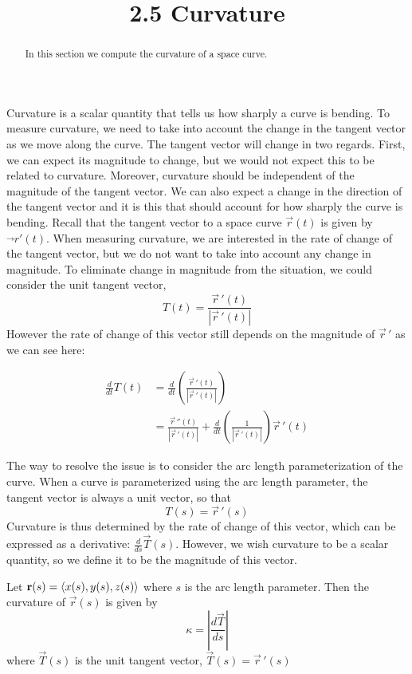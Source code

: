 \documentclass[handout]{ximera}
\title{2.5 Curvature}
\begin{document}
\begin{abstract}
In this section we compute the curvature of a space curve.
\end{abstract}

\maketitle

Curvature is a scalar quantity that tells us how sharply a curve is bending.
To measure curvature, we need to take into account the change in the tangent vector as we move along the curve.
The tangent vector will change in two regards. First, we can expect its magnitude to change, but
we would not expect this to be related to curvature. Moreover, curvature should be independent of the magnitude of the tangent vector.
We can also expect a change in the direction of the tangent vector and it is this 
that should account for how sharply the curve is bending.
Recall that the tangent vector to a space curve $\vec r(t)$ is given by $\vec\,r'(t)$.
When measuring curvature, we are interested in the rate of change of the tangent vector, but we do not want to take into account any change in magnitude.
To eliminate change in magnitude from the situation, we could consider the unit tangent vector, 
\[
T(t) = \frac{\vec r\,'(t) }{|\vec r\,'(t)|}
\]
However the rate of change of this vector still depends on the magnitude of $\vec r\,'$ as we can see here:

\begin{align*}
\frac{d}{dt} T(t) &= \frac{d}{dt} \left(\frac{\vec r\,'(t) }{|\vec r\,'(t)|}\right) \\
&= \frac{\vec r\,''(t) }{|\vec r\,'(t)|} + \frac{d}{dt} \left( \frac{1}{|\vec r\,'(t)|}\right)\vec r\,'(t)
\end{align*}

The way to resolve the issue is to consider the arc length parameterization of the curve.
When a curve is parameterized using the arc length parameter, the tangent vector is always a unit vector, so that
\[
T(s) = \vec r\,'(s)
\]
Curvature is thus determined by the rate of change of this vector, which can be expressed as a derivative: $\frac{d}{ds} \vec T(s)$.  
However, we wish curvature to be a scalar quantity, so we define it to be the magnitude of this vector.
\begin{definition}[Curvature]
Let $\mathbf r(s) = \left\langle x(s), y(s), z(s)\right\rangle$ where $s$ is the arc length parameter. Then the curvature of $\vec r(s)$ is given by 
\[
\kappa = \left|\frac{d\vec T}{ds}\right|
\]
where $\vec T(s)$ is the unit tangent vector, $\vec T(s) = \vec r\,'(s)$ 
\end{definition}
\end{document}

